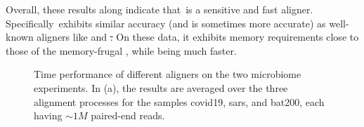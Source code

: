 Overall, these results along indicate that~\puffaligner is a
sensitive and fast aligner. Specifically~\puffaligner exhibits similar 
accuracy (and is sometimes more accurate) as well-known aligners like \bt and \st. 
On these data, it exhibits memory requirements close to those of the memory-frugal \bt, 
while being much faster.
\begin{figure}[H]
    \centering
    \hfill
    \caption[Time performance of different aligners on the microbiome
    experiments]{Time performance of different aligners on the two microbiome
    experiments. In (a), the results are averaged
    over the three alignment processes for the samples covid19, sars, and
    bat200, each having $\sim1M$ paired-end reads.
}
\end{figure}
